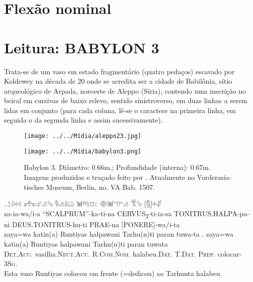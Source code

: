 \documentclass[a4paper,12pt]{memoir}
\newcommand{\Prep}{\footnotesize\textsc{Prep.}}
\newcommand{\Det}{\footnotesize\textsc{Det.}}
\newcommand{\Nom}{\footnotesize\textsc{Nom.}}
\newcommand{\Acu}{\footnotesize\textsc{Acu.}}
\newcommand{\Dat}{\footnotesize\textsc{Dat.}}
\newcommand{\Sg}{\footnotesize\textsc{Sg.}}
\newcommand{\Com}{\footnotesize\textsc{Com.}}
\newcommand{\Neut}{\footnotesize\textsc{Neut.}}
\begin{document}
\lipsum[3]

\section{Flexão nominal}

\lipsum[1]

\section{Leitura: BABYLON 3}

Trata-se de um vaso em estado fragmentário (quatro pedaços) escavado por
Koldewey na década de 20 onde se acredita ser a cidade de Babilônia, sítio
arqueológico de Arpada, noroeste de Aleppo (Síria), contendo uma inscrição no
beiral em cursivas de baixo relevo, sentido sinistroverso, em duas linhas a
serem lidas em conjunto (para cada coluna, lê-se o caractere na primeira linha,
em seguida o da segunda linha e assim sucessivamente).

\begin{figure}[ht!]
	\begin{center}
		\texttt{[image: ../../Mídia/aleppo23.jpg]}
	\end{center}
	\begin{center}
		\texttt{[image: ../../Mídia/babylon3.png]}
	\end{center}
	\caption{Babylon 3. Diâmetro: 0.66m.; Profundidade (interna): 0.67m. Imagens
		produzidas e traçado feito por \textcite[\emph{plate} 212]{CHLI_1_3}.
		Atualmente no \foreignlanguage{german}{Vorderasiatisches Museum}, Berlin, no. VA Bab. 1507.}\label{fig:babylon3}
\end{figure}


\ex.\ag.{\Large 𔖪𔓱𔗬𔗷} {\Large 𔗎𔔯𔗏𔗧𔑣𔐤} {\Large 𔑵𔑣𔓱𔗔} {\Large 𔓢𔑞𔕸𔗐} {\Large 𔖖𔓢𔕙𔑣}
{\Large 𔐎𔐤} {\Large [𔑇]𔗬𔑯}\\
za-ia-wa/i-a\hspace{10pt} ``SCALPRUM''-ka-ti-na\hspace{10pt}
CERVUS\textsubscript{2}-ti-ia-sa\hspace{10pt} TONITRUS.HALPA-pa-ni\hspace{10pt}
DEUS.TONITRUS-hu-ti\hspace{10pt} PRAE-na\hspace{10pt} [PONERE]-wa/i-ta\\
zaya=wa katin(a) Runtiyas halpawani Tarhu(n)ti paran tuwa-ta
\bg. zaya=wa katin(a) Runtiyas halpawani Tarhu(n)ti paran tuwata\\
\Det{}\Acu{} vasilha.\Neut{}\Acu{} R.\Com{}\Nom{} halabeu.\Dat{} T.\Dat{} \Prep{} colocar-3\Sg\\
Esta vaso Runtiyas colocou em frente (=dedicou) ao Tarhunta halabeu.
\end{document}
